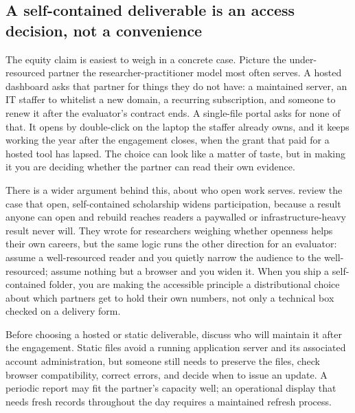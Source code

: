 \subsection{A self-contained deliverable is an access decision, not a convenience}
The equity claim is easiest to weigh in a concrete case. Picture the under-resourced partner the researcher-practitioner model most often serves. A hosted dashboard asks that partner for things they do not have: a maintained server, an IT staffer to whitelist a new domain, a recurring subscription, and someone to renew it after the evaluator's contract ends. A single-file portal asks for none of that. It opens by double-click on the laptop the staffer already owns, and it keeps working the year after the engagement closes, when the grant that paid for a hosted tool has lapsed. The choice can look like a matter of taste, but in making it you are deciding whether the partner can read their own evidence.

There is a wider argument behind this, about who open work serves. \textcite{mckiernan2016open} review the case that open, self-contained scholarship widens participation, because a result anyone can open and rebuild reaches readers a paywalled or infrastructure-heavy result never will. They wrote for researchers weighing whether openness helps their own careers, but the same logic runs the other direction for an evaluator: assume a well-resourced reader and you quietly narrow the audience to the well-resourced; assume nothing but a browser and you widen it. When you ship a self-contained folder, you are making the accessible principle a distributional choice about which partners get to hold their own numbers, not only a technical box checked on a delivery form.

Before choosing a hosted or static deliverable, discuss who will maintain it after the engagement. Static files avoid a running application server and its associated account administration, but someone still needs to preserve the files, check browser compatibility, correct errors, and decide when to issue an update. A periodic report may fit the partner's capacity well; an operational display that needs fresh records throughout the day requires a maintained refresh process.

